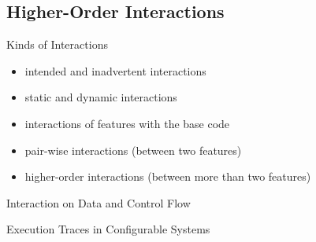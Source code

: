 
\subsection{Higher-Order Interactions}
\begin{frame}{\myframetitle}
	\begin{mycolumns}
		\begin{definition}{Kinds of Interactions}
			\begin{itemize}
				\item intended and inadvertent interactions
				\item static and dynamic interactions
				\item interactions of features with the base code
				\item pair-wise interactions (between two features)
				\item higher-order interactions (between more than two features)
			\end{itemize}
		\end{definition}
	\mynextcolumn
	\end{mycolumns}
\end{frame}

\begin{frame}{Interaction on Data and Control Flow \mytitlesource{\essentialconfigurationcomplexity}}
	\centering
\end{frame}
\begin{frame}{Execution Traces in Configurable Systems \mytitlesource{\essentialconfigurationcomplexity}}
\end{frame}

